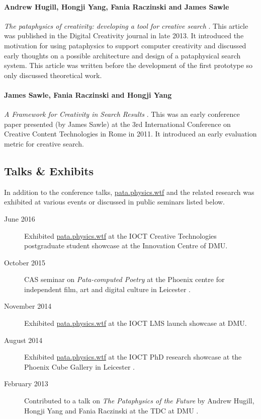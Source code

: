 \paragraph{Andrew Hugill, Hongji Yang, Fania Raczinski and James Sawle} \textit{The pataphysics of creativity: developing a tool for creative search} \autocite*{Hugill2013d}. This article was published in the Digital Creativity journal in late 2013. It introduced the motivation for using pataphysics to support computer creativity and discussed early thoughts on a possible architecture and design of a pataphysical search system. This article was written before the development of the first prototype so only discussed theoretical work.

\paragraph{James Sawle, Fania Raczinski and Hongji Yang} \textit{A Framework for Creativity in Search Results} \autocite*{Sawle2011}. This was an early conference paper presented (by James Sawle) at the 3rd International Conference on Creative Content Technologies in Rome in 2011. It introduced an early evaluation metric for creative search.


\subsection{Talks \& Exhibits}
\label{s:talks}

In addition to the conference talks, \url{pata.physics.wtf} and the related research was exhibited at various events or discussed in public seminars listed below.

\begin{description}
  \item[June 2016] Exhibited \url{pata.physics.wtf} at the \ac{IOCT} Creative Technologies postgraduate student showcase at the Innovation Centre of \ac{DMU}.
  \item[October 2015] \ac{CAS} seminar on \textit{Pata-computed Poetry} at the Phoenix centre for independent film, art and digital culture in Leicester \autocite{Clark2015,Clark2015a}.
  \item[November 2014] Exhibited \url{pata.physics.wtf} at the \ac{IOCT} \ac{LMS} launch showcase at \ac{DMU}.
  \item[August 2014] Exhibited \url{pata.physics.wtf} at the \ac{IOCT} PhD research showcase at the Phoenix Cube Gallery in Leicester \autocite{Clark2014}.
  \item[February 2013] Contributed to a talk on \textit{The Pataphysics of the Future} by Andrew Hugill, Hongji Yang and Fania Raczinski at the \ac{TDC} at \ac{DMU} \autocite{Trans2013}.
\end{description}


